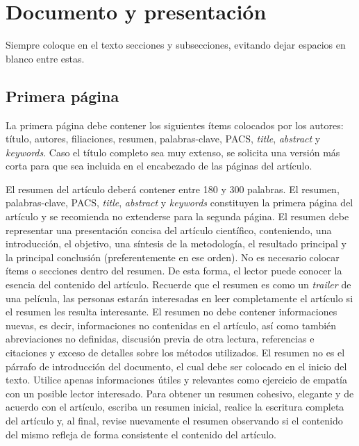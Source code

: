 \documentclass[12pt, a4paper, twoside, twocolumn]{article}
\begin{document}
\section{Documento y presentación}

Siempre coloque en el texto secciones y subsecciones, evitando dejar espacios en blanco entre estas.

\subsection{Primera página}

La primera página debe contener los siguientes ítems colocados por los autores: título, autores, filiaciones, resumen, palabras-clave, PACS, \textit{title}, \textit{abstract} y \textit{keywords}. 
%
Caso el título completo sea muy extenso, se solicita una versión más corta para que sea incluida en el encabezado de las páginas del artículo.

El resumen del artículo deberá contener entre 180 y 300 palabras. El resumen, palabras-clave, PACS, \textit{title}, \textit{abstract} y \textit{keywords} constituyen la primera página del artículo y se recomienda no extenderse para la segunda página.
%
El resumen debe representar una presentación concisa del artículo científico, conteniendo, una introducción, el objetivo, una síntesis de la metodología, el resultado principal y la principal conclusión (preferentemente en ese orden). No es necesario colocar ítems o secciones dentro del resumen. De esta forma, el lector puede conocer la esencia del contenido del artículo. Recuerde que el resumen es como un \textit{trailer} de una película, las personas estarán interesadas en leer completamente el artículo si el resumen les resulta interesante. El resumen no debe contener informaciones nuevas, es decir, informaciones no contenidas en el artículo, así como también abreviaciones no definidas, discusión previa de otra lectura, referencias e citaciones y exceso de detalles sobre los métodos utilizados. El resumen no es el párrafo de introducción del documento, el cual debe ser colocado en el inicio del texto. Utilice apenas informaciones útiles y relevantes como ejercicio de empatía con un posible lector interesado. Para obtener un resumen cohesivo, elegante y de acuerdo con el artículo, escriba un resumen inicial, realice la escritura completa del artículo y, al final, revise nuevamente el resumen observando si el contenido del mismo refleja de forma consistente el contenido del artículo. 
\end{document}

